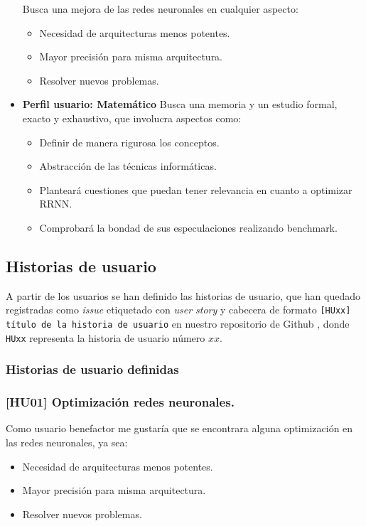 \begin{itemize}
Busca una mejora de las redes neuronales en cualquier aspecto:

\begin{itemize}
    \item Necesidad de arquitecturas menos potentes.
    \item Mayor precisión para misma arquitectura.
    \item Resolver nuevos problemas.
\end{itemize}

\item \textbf{Perfil usuario: Matemático}
Busca una memoria y un estudio formal, exacto  y exhaustivo, que involucra aspectos como: 
\begin{itemize}
    \item Definir de manera rigurosa los conceptos.
    \item Abstracción de las técnicas informáticas.
    \item Planteará cuestiones que puedan tener relevancia en cuanto a optimizar RRNN.
    \item Comprobará la bondad de sus especulaciones realizando benchmark.
\end{itemize}
\end{itemize}

\subsection{Historias de usuario}  

A partir de los usuarios se han definido las historias de usuario, que han quedado registradas 
como \textit{issue} etiquetado con \textit{user story} y cabecera de formato
\texttt{[HUxx] título de la historia de usuario} en nuestro 
repositorio de Github \cite{TFG-Estudio-de-las-redes-neuronales},
 donde \texttt{HUxx} representa
la historia de usuario número $xx$.   

\subsubsection{Historias de usuario definidas}

\subsubsection*{[HU01] Optimización redes neuronales.}
    Como usuario benefactor me gustaría que se encontrara alguna optimización en las redes neuronales, ya sea:
\begin{itemize}
    \item  Necesidad de arquitecturas menos potentes.
    \item  Mayor precisión para misma arquitectura.
    \item  Resolver nuevos problemas.
\end{itemize}

